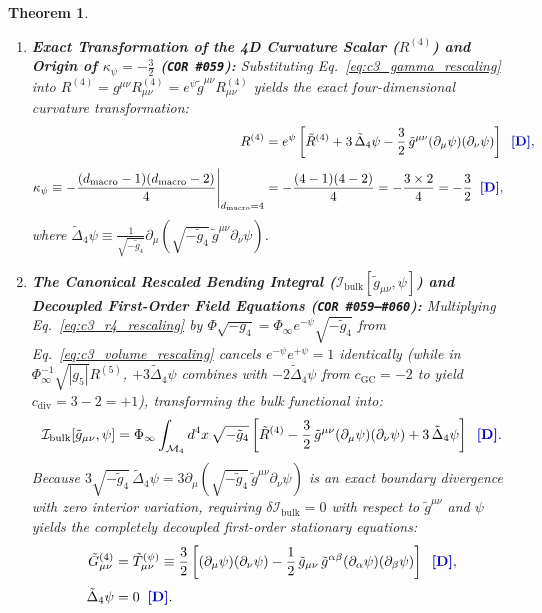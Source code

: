 \documentclass[11pt,a4paper]{article}
\newcommand{\catD}{\text{\textbf{\textcolor{blue!75!black}{[D]}}}}
\theoremstyle{definition}
\theoremstyle{plain}
\newtheorem{theorem}[axiom]{Theorem}
\theoremstyle{remark}
\begin{document}
\begin{theorem}
\begin{enumerate}[label=(\roman*)]
  \item \textbf{Exact Transformation of the 4D Curvature Scalar ($R^{(4)}$) and Origin of $\kappa_\psi = -\frac{3}{2}$ (\texttt{COR~\#059}):}
  Substituting Eq.~\eqref{eq:c3_gamma_rescaling} into $R^{(4)} = g^{\mu\nu}R_{\mu\nu}^{(4)} = e^{\psi}\tilde{g}^{\mu\nu}R_{\mu\nu}^{(4)}$ yields the exact four-dimensional curvature transformation:
  \begin{align}
  R^{(4)} &= e^{\psi}\left[\tilde{R}^{(4)} + 3\,\tilde{\Delta}_4\psi - \frac{3}{2}\,\tilde{g}^{\mu\nu}\!\left(\partial_\mu\psi\right)\!\left(\partial_\nu\psi\right)\right] \;\;\catD, \label{eq:c3_r4_rescaling} \\[4pt]
  \kappa_\psi \equiv -\frac{(d_{\mathrm{macro}} - 1)(d_{\mathrm{macro}} - 2)}{4}\Bigg|_{d_{\mathrm{macro}}=4} &= -\frac{(4 - 1)(4 - 2)}{4} = -\frac{3 \times 2}{4} = -\frac{3}{2} \;\;\catD, \label{eq:c3_three_halves_origin}
  \end{align}
  where $\tilde{\Delta}_4\psi \equiv \frac{1}{\sqrt{-\tilde{g}_4}}\partial_\mu\!\left(\sqrt{-\tilde{g}_4}\,\tilde{g}^{\mu\nu}\partial_\nu\psi\right)$.

  \item \textbf{The Canonical Rescaled Bending Integral ($\mathcal{I}_{\mathrm{bulk}}[\tilde{g}_{\mu\nu}, \psi]$) and Decoupled First-Order Field Equations (\texttt{COR~\#059--\#060}):}
  Multiplying Eq.~\eqref{eq:c3_r4_rescaling} by $\Phi\sqrt{-g_4} = \Phi_\infty e^{-\psi}\sqrt{-\tilde{g}_4}$ from Eq.~\eqref{eq:c3_volume_rescaling} cancels $e^{-\psi}e^{+\psi} = 1$ identically (while in $\Phi_\infty^{-1}\sqrt{|g_5|}R^{(5)}$, $+3\tilde{\Delta}_4\psi$ combines with $-2\tilde{\Delta}_4\psi$ from $c_{\mathrm{GC}}=-2$ to yield $c_{\mathrm{div}} = 3 - 2 = +1$), transforming the bulk functional into:
  \begin{equation}\label{eq:c3_canonical_action}
  \mathcal{I}_{\mathrm{bulk}}\!\left[\tilde{g}_{\mu\nu}, \psi\right] = \Phi_\infty\int_{\mathcal{M}_4} d^4x\,\sqrt{-\tilde{g}_4}\left[\tilde{R}^{(4)} - \frac{3}{2}\,\tilde{g}^{\mu\nu}\!\left(\partial_\mu\psi\right)\!\left(\partial_\nu\psi\right) + 3\,\tilde{\Delta}_4\psi\right] \;\;\catD.
  \end{equation}
  Because $3\sqrt{-\tilde{g}_4}\,\tilde{\Delta}_4\psi = 3\partial_\mu\!\left(\sqrt{-\tilde{g}_4}\,\tilde{g}^{\mu\nu}\partial_\nu\psi\right)$ is an exact boundary divergence with zero interior variation, requiring $\delta\mathcal{I}_{\mathrm{bulk}} = 0$ with respect to $\tilde{g}^{\mu\nu}$ and $\psi$ yields the completely decoupled first-order stationary equations:
  \begin{align}
  \tilde{G}_{\mu\nu}^{(4)} &= \tilde{T}_{\mu\nu}^{(\psi)} \equiv \frac{3}{2}\left[\left(\partial_\mu\psi\right)\!\left(\partial_\nu\psi\right) - \frac{1}{2}\,\tilde{g}_{\mu\nu}\,\tilde{g}^{\alpha\beta}\!\left(\partial_\alpha\psi\right)\!\left(\partial_\beta\psi\right)\right] \;\;\catD, \nonumber \\[3pt]
  \tilde{\Delta}_4\psi &= 0 \;\;\catD. \label{eq:c3_canonical_field_eqs}
  \end{align}
\end{enumerate}
\end{theorem}
\end{document}
